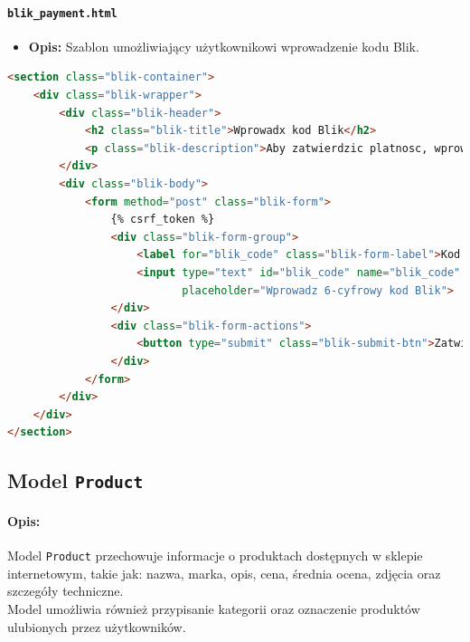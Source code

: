 \documentclass[12pt,a4paper,oneside]{article}
\theoremstyle{definition}
\numberwithin{equation}{section}
\begin{document}
\paragraph{\texttt{blik\_payment.html}}
\begin{itemize}
    \item \textbf{Opis:} Szablon umożliwiający użytkownikowi wprowadzenie kodu Blik.
\end{itemize}

\begin{lstlisting}[language=HTML, caption=Szablon \texttt{blik\_payment.html}]
<section class="blik-container">
    <div class="blik-wrapper">
        <div class="blik-header">
            <h2 class="blik-title">Wprowadx kod Blik</h2>
            <p class="blik-description">Aby zatwierdzic platnosc, wprowadz 6-cyfrowy kod wygenerowany w aplikacji mobilnej banku.</p>
        </div>
        <div class="blik-body">
            <form method="post" class="blik-form">
                {% csrf_token %}
                <div class="blik-form-group">
                    <label for="blik_code" class="blik-form-label">Kod Blik</label>
                    <input type="text" id="blik_code" name="blik_code" maxlength="6" class="blik-form-input"
                           placeholder="Wprowadz 6-cyfrowy kod Blik">
                </div>
                <div class="blik-form-actions">
                    <button type="submit" class="blik-submit-btn">Zatwierdz kod</button>
                </div>
            </form>
        </div>
    </div>
</section>
\end{lstlisting}

% 
% 
\clearpage
\subsection{Model \texttt{Product}}
\paragraph{Opis:}  Model \texttt{Product} przechowuje informacje o produktach dostępnych w sklepie internetowym,
    takie jak: nazwa, marka, opis, cena, średnia ocena, zdjęcia oraz szczegóły techniczne.\\
    Model umożliwia również przypisanie kategorii oraz oznaczenie produktów ulubionych przez użytkowników.
\end{document}
